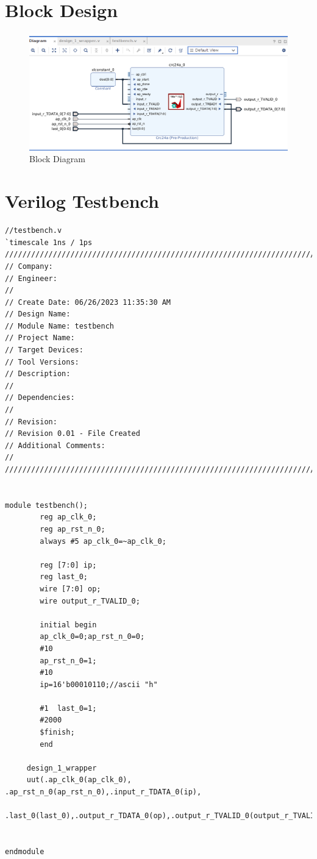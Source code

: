 \documentclass{article}
\begin{document}
\section{Block Design}
\vspace{1cm}
\begin{figure}[h]
    \centering
\includegraphics[width=\columnwidth]{figs/p1bd.png}
    \caption{Block Diagram}
    \label{fig:my_label}
\end{figure}
\vspace{3cm}
\section{Verilog Testbench}
\begin{lstlisting}
//testbench.v
`timescale 1ns / 1ps
//////////////////////////////////////////////////////////////////////////////////
// Company: 
// Engineer: 
// 
// Create Date: 06/26/2023 11:35:30 AM
// Design Name: 
// Module Name: testbench
// Project Name: 
// Target Devices: 
// Tool Versions: 
// Description: 
// 
// Dependencies: 
// 
// Revision:
// Revision 0.01 - File Created
// Additional Comments:
// 
//////////////////////////////////////////////////////////////////////////////////


module testbench();
        reg ap_clk_0;
        reg ap_rst_n_0;
        always #5 ap_clk_0=~ap_clk_0;
        
        reg [7:0] ip;
        reg last_0;
        wire [7:0] op;
        wire output_r_TVALID_0;
       
        initial begin
        ap_clk_0=0;ap_rst_n_0=0;
        #10
        ap_rst_n_0=1;
        #10
        ip=16'b00010110;//ascii "h"

        #1  last_0=1;
        #2000
        $finish;
        end
     
     design_1_wrapper
     uut(.ap_clk_0(ap_clk_0), .ap_rst_n_0(ap_rst_n_0),.input_r_TDATA_0(ip),
     .last_0(last_0),.output_r_TDATA_0(op),.output_r_TVALID_0(output_r_TVALID_0));
    
    
endmodule

\end{lstlisting}
\end{document}
